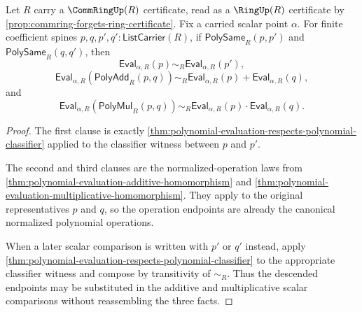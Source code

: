 \begin{theorem}
\label{thm:polynomial-evaluation-semiring-morphism}
Let $R$ carry a $\CommRingUp(R)$ certificate, read as a $\RingUp(R)$ certificate by \autoref{prop:commring-forgets-ring-certificate}. Fix a carried scalar point $\alpha$. For finite coefficient spines $p,q,p',q':\mathsf{ListCarrier}(R)$, if $\mathsf{PolySame}_R(p,p')$ and $\mathsf{PolySame}_R(q,q')$, then
$$
\mathsf{Eval}_{\alpha,R}(p)\sim_R\mathsf{Eval}_{\alpha,R}(p'),
$$
$$
\mathsf{Eval}_{\alpha,R}(\mathsf{PolyAdd}_R(p,q))\sim_R
\mathsf{Eval}_{\alpha,R}(p)+\mathsf{Eval}_{\alpha,R}(q),
$$
and
$$
\mathsf{Eval}_{\alpha,R}(\mathsf{PolyMul}_R(p,q))\sim_R
\mathsf{Eval}_{\alpha,R}(p)\cdot\mathsf{Eval}_{\alpha,R}(q).
$$
\end{theorem}
\begin{proof}
The first clause is exactly \autoref{thm:polynomial-evaluation-respects-polynomial-classifier} applied to the classifier witness between $p$ and $p'$.

The second and third clauses are the normalized-operation laws from \autoref{thm:polynomial-evaluation-additive-homomorphism} and \autoref{thm:polynomial-evaluation-multiplicative-homomorphism}. They apply to the original representatives $p$ and $q$, so the operation endpoints are already the canonical normalized polynomial operations.

When a later scalar comparison is written with $p'$ or $q'$ instead, apply \autoref{thm:polynomial-evaluation-respects-polynomial-classifier} to the appropriate classifier witness and compose by transitivity of $\sim_R$. Thus the descended endpoints may be substituted in the additive and multiplicative scalar comparisons without reassembling the three facts.
\end{proof}

